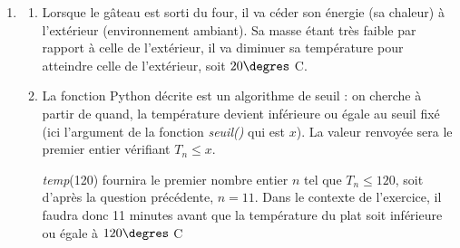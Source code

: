 \begin{enumerate}
\begin{enumerate}
		Donc $\forall n\in \N$, $u_{n+1}=0,955u_n$ donc la suite $\left(u_n\right)$  est géométrique de raison 0,955 et de premier terme $u_0=T_0-20=160$.
		\item $\forall n\in \N$, $u_n=u_0 \times q^n=160 \times 0,955^n$.
	
	De plus  $\forall n\in \N$, $u_n=T_n-20$ donc $T_n=u_n+20=160\times 0,955^n+20$.
		\item $\displaystyle\lim\limits_{n \rightarrow +\infty} 0,955^n=0$ car $0,955\in ]-1~;~1[$. Donc $\displaystyle\lim\limits_{n \rightarrow +\infty} T_n=20$.
		\item $\begin{gathered}T_n\leqslant 120 \iff 160\times 0,955^n+20\leqslant 120 \iff 160\times 0,955^n \leqslant 120-20 \iff 160\times 0,955^n \leqslant 100 \\
		\iff 0,955^n \leqslant \dfrac{100}{160} \iff 0,955^n \leqslant \dfrac58\end{gathered}$.

		Sachant que la fonction $f:x\mapsto \ln(x)$ est strictement croissante sur $]0~;~+\infty[$, on obtient :

$\ln\left(0,955^n\right)\leqslant \ln\left(\dfrac58\right) \iff  n \times \ln(0,955) \leqslant \ln\left(\dfrac58\right)$. Or $\ln(0,955)<0$ donc,

$n\geqslant \dfrac{\ln\left(\dfrac58\right)}{\ln(0,955)}$. À la calculatrice, $\dfrac{\ln\left(\dfrac58\right)}{\ln(0,955)} \approx 10,21$ donc $n\geqslant 11$.
	\end{enumerate}
\item 
\begin{enumerate}
	\item Lorsque le gâteau est sorti du four, il va céder son énergie (sa chaleur) à l'extérieur (environnement ambiant). Sa masse étant très faible par rapport à celle de l'extérieur, il va diminuer sa température pour atteindre celle de l'extérieur, soit $20 \degres$ C.
	\item La fonction Python décrite est un algorithme de seuil : on cherche à partir de quand, la température devient inférieure ou égale au seuil fixé (ici l'argument de la fonction \textit{seuil()} qui est $x$). La valeur renvoyée sera le premier entier vérifiant $T_n\leqslant x$.

\textit{temp}(120) fournira le premier nombre entier $n$ tel que $T_n\leqslant 120$, soit d'après la question précédente, $n=11$. Dans le contexte de l'exercice, il faudra donc 11 minutes avant que la température du plat soit inférieure ou égale à $120 \degres$ C
\end{enumerate}
\end{enumerate}
\pagebreak
